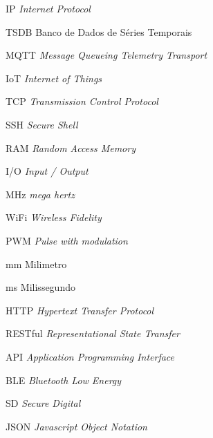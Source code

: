 \documentclass[
	12pt,				%
	oneside,
	a4paper,			%
	english,			%
	brazil				%
	]{abntex2ufop} %
\begin{document}
\listoffigures*
\cleardoublepage

\listoftables*
\cleardoublepage

\renewcommand{\lstlistingname}{Código}
\renewcommand{\lstlistlistingname}{Lista de códigos}
\lstlistoflistings
\cleardoublepage

\begin{siglas}
  \item[IP] \textit{Internet Protocol}
  \item[TSDB] Banco de Dados de Séries Temporais
  \item[MQTT] \textit{Message Queueing Telemetry Transport}
  \item[IoT] \textit{Internet of Things}
  \item[TCP] \textit{Transmission Control Protocol}
  \item[SSH] \textit{Secure Shell}
  \item[RAM] \textit{Random Access Memory}
  \item[I/O] \textit{Input / Output}
  \item[MHz] \textit{mega hertz}
  \item[WiFi] \textit{Wireless Fidelity}
  \item[PWM] \textit{Pulse with modulation}
  \item[mm] Milimetro
  \item[ms] Milissegundo
  \item[HTTP] \textit{Hypertext Transfer Protocol}
  \item[RESTful] \textit{Representational State Transfer}
  \item[API] \textit{Application Programming Interface}
  \item[BLE] \textit{Bluetooth Low Energy}
  \item[SD] \textit{Secure Digital}
  \item[JSON] \textit{Javascript Object Notation}
\end{siglas}

\end{document}
